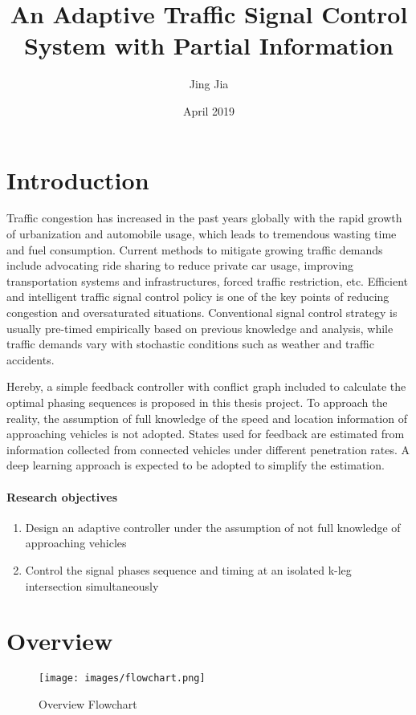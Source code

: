 \documentclass{article}
\title{An Adaptive Traffic Signal Control System with Partial Information}
\author{Jing Jia}
\date{April 2019}
\begin{document}
\maketitle


\section{Introduction}

Traffic congestion has increased in the past years globally with the rapid growth of urbanization and automobile usage, which leads to tremendous wasting time and fuel consumption. Current methods to mitigate growing traffic demands include advocating ride sharing to reduce private car usage, improving transportation systems and infrastructures, forced traffic restriction, etc. Efficient and intelligent traffic signal control policy is one of the key points of reducing congestion and oversaturated situations. Conventional signal control strategy is usually pre-timed empirically based on previous knowledge and analysis, while traffic demands vary with stochastic conditions such as weather and traffic accidents. 

Hereby, a simple feedback controller with conflict graph included to calculate the optimal phasing sequences is proposed in this thesis project. To approach the reality, the assumption of full knowledge of the speed and location information of approaching vehicles is not adopted. States used for feedback are estimated from information collected from connected vehicles under different penetration rates. A deep learning approach is expected to be adopted to simplify the estimation.


\paragraph{Research objectives}
\begin{enumerate}
    \item Design an adaptive controller under the assumption of not full knowledge of approaching vehicles
    \item Control the signal phases sequence and timing at an isolated k-leg intersection simultaneously

\end{enumerate}
\section{Overview}

\begin{figure}[htbp]
    \centering
    \texttt{[image: images/flowchart.png]}
    \caption{Overview Flowchart}
    \label{fig:flc}
\end{figure}
\end{document}
